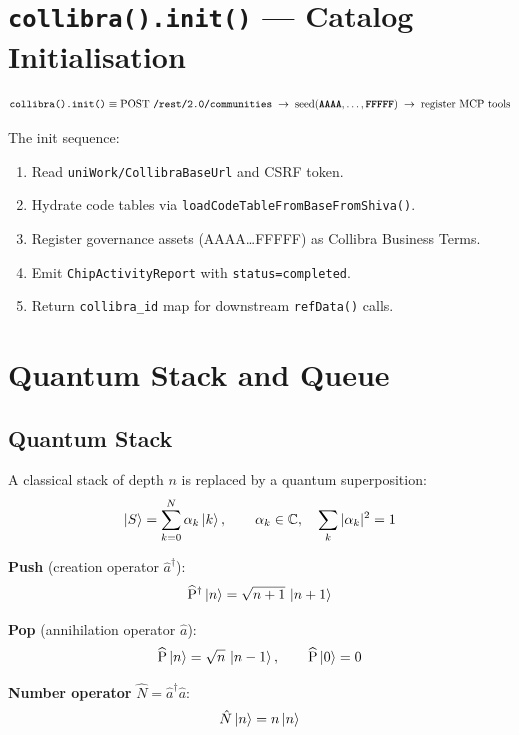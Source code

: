 \documentclass[12pt,a4paper]{article}
\DeclareMathOperator{\Push}{\widehat{P}^\dagger}
\DeclareMathOperator{\Pop}{\widehat{P}}
\newcommand{\Ctable}[1]{\texttt{\textbf{#1}}}
\begin{document}
\section{\texttt{collibra().init()} — Catalog Initialisation}

\[
  \texttt{collibra().init()} \equiv
  \text{POST } \texttt{/rest/2.0/communities} \;\to\;
  \text{seed}(\Ctable{AAAA},\ldots,\Ctable{FFFFF})
  \;\to\; \text{register MCP tools}
\]

The init sequence:

\begin{enumerate}
  \item Read \texttt{uniWork/CollibraBaseUrl} and CSRF token.
  \item Hydrate code tables via \texttt{loadCodeTableFromBaseFromShiva()}.
  \item Register governance assets (AAAA\ldots FFFFF) as Collibra Business Terms.
  \item Emit \texttt{ChipActivityReport} with \texttt{status=completed}.
  \item Return \texttt{collibra\_id} map for downstream \texttt{refData()} calls.
\end{enumerate}

\section{Quantum Stack and Queue}

\subsection{Quantum Stack}

A classical stack of depth $n$ is replaced by a quantum superposition:
\[
  \ket{S} = \sum_{k=0}^{N} \alpha_k \ket{k}, \qquad
  \alpha_k \in \mathbb{C}, \quad \sum_k |\alpha_k|^2 = 1
\]

\textbf{Push} (creation operator $\hat{a}^\dagger$):
\[
  \Push\ket{n} = \sqrt{n+1}\,\ket{n+1}
\]

\textbf{Pop} (annihilation operator $\hat{a}$):
\[
  \Pop\ket{n} = \sqrt{n}\,\ket{n-1}, \qquad \Pop\ket{0} = 0
\]

\textbf{Number operator} $\hat{N} = \hat{a}^\dagger\hat{a}$:
\[
  \hat{N}\ket{n} = n\ket{n}
\]
\end{document}
